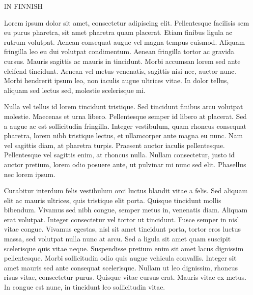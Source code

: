\justify
IN FINNISH

Lorem ipsum dolor sit amet, consectetur adipiscing elit. Pellentesque facilisis sem eu purus pharetra, sit amet pharetra quam placerat. Etiam finibus ligula ac rutrum volutpat. Aenean consequat augue vel magna tempus euismod. Aliquam fringilla leo eu dui volutpat condimentum. Aenean fringilla tortor ac gravida cursus. Mauris sagittis ac mauris in tincidunt. Morbi accumsan lorem sed ante eleifend tincidunt. Aenean vel metus venenatis, sagittis nisi nec, auctor nunc. Morbi hendrerit ipsum leo, non iaculis augue ultrices vitae. In dolor tellus, aliquam sed lectus sed, molestie scelerisque mi.

Nulla vel tellus id lorem tincidunt tristique. Sed tincidunt finibus arcu volutpat molestie. Maecenas et urna libero. Pellentesque semper id libero at placerat. Sed a augue ac est sollicitudin fringilla. Integer vestibulum, quam rhoncus consequat pharetra, lorem nibh tristique lectus, et ullamcorper ante magna eu nunc. Nam vel sagittis diam, at pharetra turpis. Praesent auctor iaculis pellentesque. Pellentesque vel sagittis enim, at rhoncus nulla. Nullam consectetur, justo id auctor pretium, lorem odio posuere ante, ut pulvinar mi nunc sed elit. Phasellus nec lorem ipsum.

Curabitur interdum felis vestibulum orci luctus blandit vitae a felis. Sed aliquam elit ac mauris ultrices, quis tristique elit porta. Quisque tincidunt mollis bibendum. Vivamus sed nibh congue, semper metus in, venenatis diam. Aliquam erat volutpat. Integer consectetur vel tortor ut tincidunt. Fusce semper in nisl vitae congue. Vivamus egestas, nisl sit amet tincidunt porta, tortor eros luctus massa, sed volutpat nulla nunc at arcu. Sed a ligula sit amet quam suscipit scelerisque quis vitae neque. Suspendisse pretium enim sit amet lacus dignissim pellentesque. Morbi sollicitudin odio quis augue vehicula convallis. Integer sit amet mauris sed ante consequat scelerisque. Nullam ut leo dignissim, rhoncus risus vitae, consectetur purus. Quisque vitae cursus erat. Mauris vitae ex metus. In congue est nunc, in tincidunt leo sollicitudin vitae.